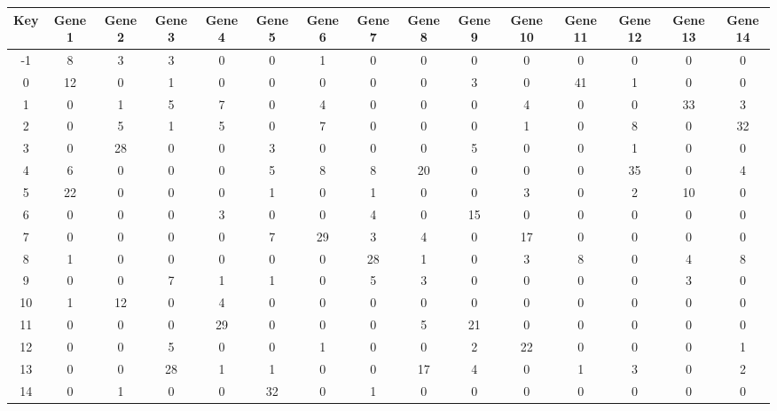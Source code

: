 \begin{tabular}{|c|c|c|c|c|c|c|c|c|c|c|c|c|c|c|}
\hline
Key & Gene 1 & Gene 2 & Gene 3 & Gene 4 & Gene 5 & Gene 6 & Gene 7 & Gene 8 & Gene 9 & Gene 10 & Gene 11 & Gene 12 & Gene 13 & Gene 14 \\
\hline
-1 & 8 & 3 & 3 & 0 & 0 & 1 & 0 & 0 & 0 & 0 & 0 & 0 & 0 & 0 \\
0 & 12 & 0 & 1 & 0 & 0 & 0 & 0 & 0 & 3 & 0 & 41 & 1 & 0 & 0 \\
1 & 0 & 1 & 5 & 7 & 0 & 4 & 0 & 0 & 0 & 4 & 0 & 0 & 33 & 3 \\
2 & 0 & 5 & 1 & 5 & 0 & 7 & 0 & 0 & 0 & 1 & 0 & 8 & 0 & 32 \\
3 & 0 & 28 & 0 & 0 & 3 & 0 & 0 & 0 & 5 & 0 & 0 & 1 & 0 & 0 \\
4 & 6 & 0 & 0 & 0 & 5 & 8 & 8 & 20 & 0 & 0 & 0 & 35 & 0 & 4 \\
5 & 22 & 0 & 0 & 0 & 1 & 0 & 1 & 0 & 0 & 3 & 0 & 2 & 10 & 0 \\
6 & 0 & 0 & 0 & 3 & 0 & 0 & 4 & 0 & 15 & 0 & 0 & 0 & 0 & 0 \\
7 & 0 & 0 & 0 & 0 & 7 & 29 & 3 & 4 & 0 & 17 & 0 & 0 & 0 & 0 \\
8 & 1 & 0 & 0 & 0 & 0 & 0 & 28 & 1 & 0 & 3 & 8 & 0 & 4 & 8 \\
9 & 0 & 0 & 7 & 1 & 1 & 0 & 5 & 3 & 0 & 0 & 0 & 0 & 3 & 0 \\
10 & 1 & 12 & 0 & 4 & 0 & 0 & 0 & 0 & 0 & 0 & 0 & 0 & 0 & 0 \\
11 & 0 & 0 & 0 & 29 & 0 & 0 & 0 & 5 & 21 & 0 & 0 & 0 & 0 & 0 \\
12 & 0 & 0 & 5 & 0 & 0 & 1 & 0 & 0 & 2 & 22 & 0 & 0 & 0 & 1 \\
13 & 0 & 0 & 28 & 1 & 1 & 0 & 0 & 17 & 4 & 0 & 1 & 3 & 0 & 2 \\
14 & 0 & 1 & 0 & 0 & 32 & 0 & 1 & 0 & 0 & 0 & 0 & 0 & 0 & 0 \\
\hline
\end{tabular}